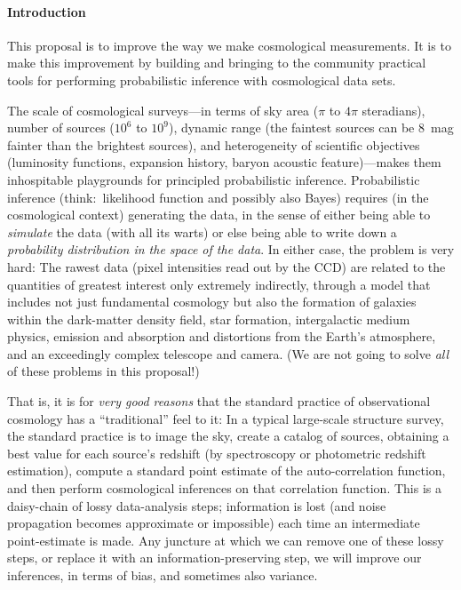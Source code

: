 \documentclass[12pt]{article}
\begin{document}
\sloppy\sloppypar

\paragraph{Introduction}
This proposal is to improve the way we make cosmological measurements.
It is to make this improvement by building and bringing to the
community practical tools for performing probabilistic inference with
cosmological data sets.

The scale of cosmological surveys---in terms of sky area ($\pi$ to
$4\pi$ steradians), number of sources ($10^6$ to $10^9$), dynamic
range (the faintest sources can be 8~mag fainter than the brightest
sources), and heterogeneity of scientific objectives (luminosity
functions, expansion history, baryon acoustic feature)---makes them
inhospitable playgrounds for principled probabilistic inference.
Probabilistic inference (think:\ likelihood function and possibly also
Bayes) requires (in the cosmological context) generating the data, in
the sense of either being able to \emph{simulate} the data (with all
its warts) or else being able to write down a \emph{probability
  distribution in the space of the data}.
In either case, the problem is very hard:
The rawest data (pixel intensities read out by the CCD) are related to
the quantities of greatest interest only extremely indirectly, through
a model that includes not just fundamental cosmology but also the
formation of galaxies within the dark-matter density field, star
formation, intergalactic medium physics, emission and absorption and
distortions from the Earth's atmosphere, and an exceedingly complex
telescope and camera.
(We are not going to solve \emph{all} of these problems in this proposal!)

That is, it is for \emph{very good reasons} that the standard practice
of observational cosmology has a ``traditional'' feel to it:
In a typical large-scale structure survey, the standard practice is to
image the sky, create a catalog of sources, obtaining a best value for
each source's redshift (by spectroscopy or photometric redshift
estimation), compute a standard point estimate of the auto-correlation
function, and then perform cosmological inferences on that correlation
function.
This is a daisy-chain of lossy data-analysis steps; information is
lost (and noise propagation becomes approximate or impossible) each
time an intermediate point-estimate is made.
Any juncture at which we can remove one of these lossy steps, or
replace it with an information-preserving step, we will improve our
inferences, in terms of bias, and sometimes also variance.
\end{document}
